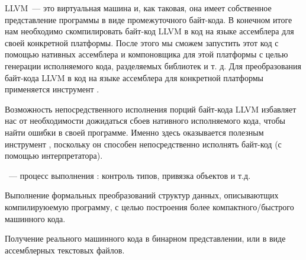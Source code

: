 
LLVM\ --- это виртуальная машина и, как таковая, она имеет собственное
представление программы в виде промежуточного байт-кода. В конечном итоге нам
необходимо скомпилировать байт-код LLVM в код на языке ассемблера для своей
конкретной платформы. После этого мы сможем запустить этот код с помощью
нативных ассемблера и компоновщика для этой платформы с целью генерации
исполняемого кода, разделяемых библиотек и т. д. Для преобразования байт-кода
LLVM в код на языке ассемблера для конкретной платформы применяется инструмент
.

Возможность непосредственного исполнения порций байт-кода LLVM избавляет нас от
необходимости дожидаться сбоев нативного исполняемого кода, чтобы найти ошибки в
своей программе. Именно здесь оказывается полезным инструмент ,
поскольку он способен непосредственно исполнять байт-код (с помощью
интерпретатора).


\begin{framed}\noindent
{}\ --- процесс выполнения
: контроль типов, привязка объектов и т.д. 
\end{framed}


Выполнение формальных преобразований структур данных, описываютщих
компилируюемую программу, с целью построения более компактного/быстрого
машинного кода.


Получение реального машинного кода в бинарном представлении, или в виде
ассемблерных текстовых файлов.


\secup
